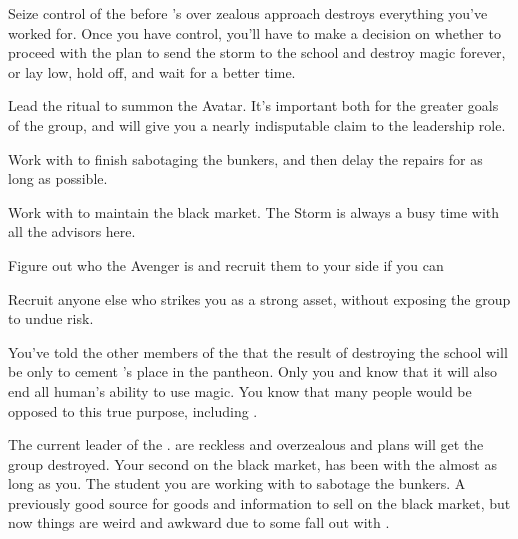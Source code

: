 \documentclass[char]{GL2020}
\begin{document}
\begin{itemz}[Goals]
	\item Seize control of the \pGoaties{} before \cChupLeader{}’s over zealous approach destroys everything you’ve worked for. Once you have control, you’ll have to make a decision on whether to proceed with the plan to send the storm to the school and destroy magic forever, or lay low, hold off, and wait for a better time.
	\item Lead the ritual to summon the \cGenesis{} Avatar. It’s important both for the greater goals of the group, and will give you a nearly indisputable claim to the leadership role.
	\item Work with \cChupStudent{} to finish sabotaging the bunkers, and then delay the repairs for as long as possible.
	\item Work with \cChupInventor{} to maintain the black market. The Storm is always a busy time with all the advisors here.
	\item Figure out who the Avenger is and recruit them to your side if you can 
\item Recruit anyone else who strikes you as a strong asset, without exposing the group to undue risk.
\end{itemz}

\begin{itemz}[Notes]
	\item You’ve told the other members of the \pGoaties{} that the result of destroying the school will be only to cement \cGenesis{}’s place in the pantheon. Only you and \cChupLeader{} know that it will also end all human’s ability to use magic. You know that many people would be opposed to this true purpose, including \cChupInventor{}.
\end{itemz}

\begin{contacts}
	\contact{\cChupLeader{}} The current leader of the \pGoaties{}. \cChupLeader{\They} are reckless and overzealous and \cChupLeader{\their} plans will get the group destroyed.
	\contact{\cChupInventor{}} Your second on the black market, \cChupInventor{} has been with the \pGoaties{} almost as long as you.
	\contact{\cChupStudent{}} The student you are working with to sabotage the bunkers.
	\contact{\cEthics{}} A previously good source for goods and information to sell on the black market, but now things are weird and awkward due to some fall out with \cLibrarian{}.
\end{contacts}
\end{document}
